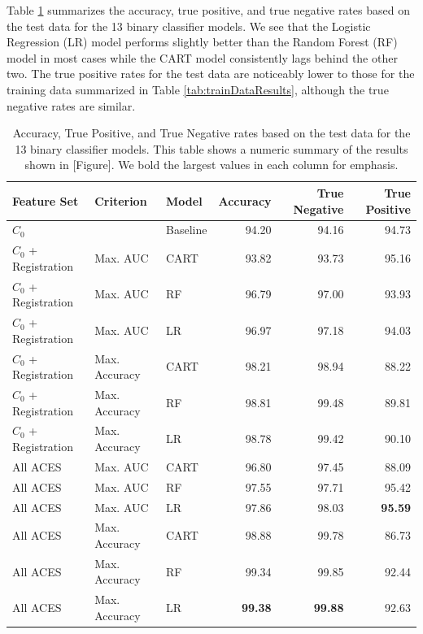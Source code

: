 \documentclass[11pt,]{isuthesis}
\begin{document}
Table \ref{tab:testDataResults} summarizes the accuracy, true positive, and true negative rates based on the test data for the 13 binary classifier models.
We see that the Logistic Regression (LR) model performs slightly better than the Random Forest (RF) model in most cases while the CART model consistently lags behind the other two.
The true positive rates for the test data are noticeably lower to those for the training data summarized in Table \ref{tab:trainDataResults}, although the true negative rates are similar.

\begin{table}

\caption{\label{tab:testDataResults}Accuracy, True Positive, and True Negative rates based on the test data for the 13 binary classifier models. This table shows a numeric summary of the results shown in [Figure]. We bold the largest values in each column for emphasis.}
\centering
\begin{tabular}[t]{lllrrr}
\toprule
Feature Set & Criterion & Model & Accuracy & True Negative & True Positive\\
\midrule
$C_0$ &  & Baseline & 94.20 & 94.16 & 94.73\\
\addlinespace
$C_0$ + Registration & Max. AUC & CART & 93.82 & 93.73 & 95.16\\
$C_0$ + Registration & Max. AUC & RF & 96.79 & 97.00 & 93.93\\
$C_0$ + Registration & Max. AUC & LR & 96.97 & 97.18 & 94.03\\
\addlinespace
$C_0$ + Registration & Max. Accuracy & CART & 98.21 & 98.94 & 88.22\\
$C_0$ + Registration & Max. Accuracy & RF & 98.81 & 99.48 & 89.81\\
$C_0$ + Registration & Max. Accuracy & LR & 98.78 & 99.42 & 90.10\\
\addlinespace
All ACES & Max. AUC & CART & 96.80 & 97.45 & 88.09\\
All ACES & Max. AUC & RF & 97.55 & 97.71 & 95.42\\
All ACES & Max. AUC & LR & 97.86 & 98.03 & \textbf{95.59}\\
\addlinespace
All ACES & Max. Accuracy & CART & 98.88 & 99.78 & 86.73\\
All ACES & Max. Accuracy & RF & 99.34 & 99.85 & 92.44\\
All ACES & Max. Accuracy & LR & \textbf{99.38} & \textbf{99.88} & 92.63\\
\bottomrule
\end{tabular}
\end{table}
\end{document}
